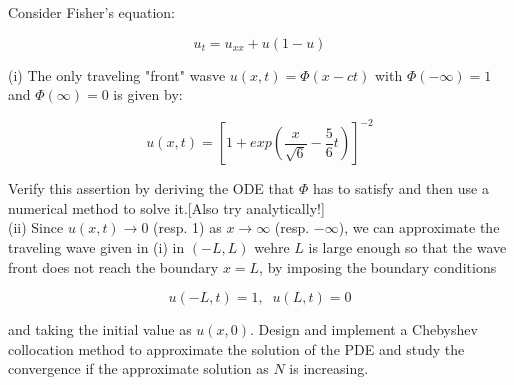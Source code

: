 Consider Fisher's equation:

$$u_t = u_{xx} + u(1 - u)$$

(i) The only traveling "front" wasve $u(x,t) = \Phi(x - ct)$ with $\Phi(-\infty)=1$ and $\Phi(\infty)=0$
is given by:

$$u(x,t) = [1+exp(\frac{x}{\sqrt{6}} - \frac56t)]^{-2}$$

Verify this assertion by deriving the ODE that $\Phi$ has to satisfy and then use a numerical method to
solve it.[Also try analytically!]\\

(ii) Since $u(x,t)\to0$ (resp. 1) as $x\to\infty$ (resp. $-\infty$), we can approximate the traveling
wave given in (i) in $(-L,L)$ wehre $L$ is large enough so that the wave front does not reach the
boundary $x=L$, by imposing the boundary conditions

$$u(-L,t) = 1,\;\;u(L,t) = 0$$

and taking the initial value as $u(x,0)$. Design and implement a Chebyshev collocation method to
approximate the solution of the PDE and study the convergence if the approximate solution as $N$ is
increasing.